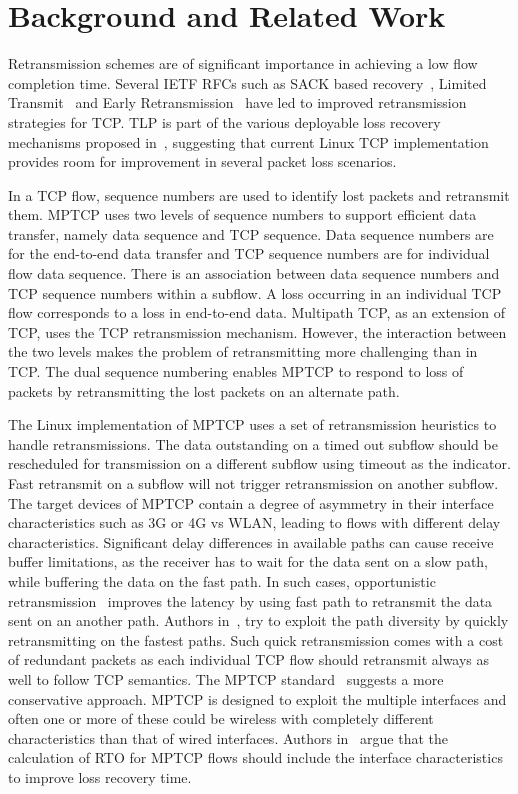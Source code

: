 \documentclass[10pt,conference]{IEEEtran}
\begin{document}
\section{Background and Related Work}\label{relwork}

Retransmission schemes are of significant importance in achieving a low flow completion time. Several IETF RFCs such as SACK based 
recovery~\cite{rfc6675}, Limited Transmit~\cite{rfc3042} and Early Retransmission~\cite{rfc5827} have led to improved retransmission 
strategies for TCP. TLP is part of the various deployable loss recovery mechanisms proposed in~\cite{Flach:2013}, suggesting that current 
Linux TCP implementation provides room for improvement in several packet loss scenarios. 

In a TCP flow, sequence numbers are used to identify lost packets and retransmit them. MPTCP uses two levels of sequence numbers to support 
efficient data transfer, namely data sequence and TCP sequence. Data sequence numbers are for the end-to-end data transfer and TCP sequence 
numbers are for individual flow data sequence. There is an association between data sequence numbers and TCP sequence numbers within a subflow.  
A loss occurring in an individual TCP flow corresponds to a loss in end-to-end data. Multipath TCP, as an extension of TCP, uses the 
TCP retransmission mechanism. However, the interaction between the two levels makes the problem of retransmitting more challenging than in TCP. The dual sequence 
numbering enables MPTCP to respond to loss of packets by retransmitting the lost packets on an alternate path.  

The Linux implementation of MPTCP uses a set of retransmission heuristics to handle retransmissions. The data outstanding on a timed out subflow 
should be rescheduled for transmission on a different subflow using timeout as the indicator. Fast retransmit on a subflow will not trigger 
retransmission on another subflow. The target devices of MPTCP contain a degree of asymmetry in their interface characteristics such as 3G or 
4G vs WLAN, leading to flows with different delay characteristics. Significant delay differences in available paths can cause receive buffer 
limitations, as the receiver has to wait for the data sent on a slow path, while buffering the data on the fast path. In such cases, opportunistic 
retransmission~\cite{Costin} improves the latency by using fast path to retransmit the data sent on an another path. Authors in~\cite{fuso}, try 
to exploit the path diversity by quickly retransmitting on the fastest paths. Such quick retransmission comes with a cost of redundant packets as 
each individual TCP flow should retransmit always as well to follow TCP semantics. The MPTCP standard~\cite{rfc6824} suggests a more conservative 
approach. MPTCP is designed to exploit the multiple interfaces and often one or more of these could be wireless with completely different 
characteristics than that of wired interfaces. Authors in~\cite{Shin} argue that the calculation of RTO for MPTCP flows should include the 
interface characteristics to improve loss recovery time. 
\end{document}
